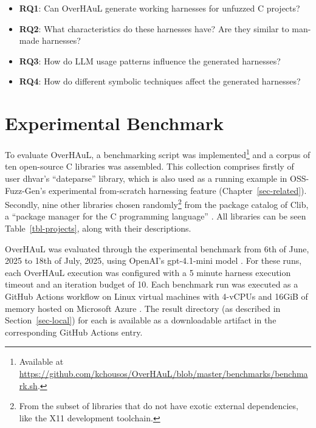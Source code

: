 \documentclass[
  a4paper,
]{scrreprt}
\theoremstyle{definition}
\theoremstyle{remark}
\begin{document}
\begin{itemize}
\item
  \textbf{RQ1}: Can OverHAuL generate working harnesses for unfuzzed C
  projects?
\item
  \textbf{RQ2}: What characteristics do these harnesses have? Are they
  similar to man-made harnesses?
\item
  \textbf{RQ3}: How do LLM usage patterns influence the generated
  harnesses?
\item
  \textbf{RQ4}: How do different symbolic techniques affect the
  generated harnesses?
\end{itemize}

\section{Experimental Benchmark}\label{sec-benchmark}

To evaluate OverHAuL, a benchmarking script was implemented\footnote{Available
  at
  \url{https://github.com/kchousos/OverHAuL/blob/master/benchmarks/benchmark.sh}.}
and a corpus of ten open-source C libraries was assembled. This
collection comprises firstly of user dhvar's ``dateparse'' library,
which is also used as a running example in OSS-Fuzz-Gen's
\autocite{oss-fuzz-gen} experimental from-scratch harnessing feature
(Chapter~\ref{sec-related}). Secondly, nine other libraries chosen
randomly\footnote{From the subset of libraries that do not have exotic
  external dependencies, like the X11 development toolchain.} from the
package catalog of Clib, a ``package manager for the C programming
language'' \autocite{clibs,clib}. All libraries can be seen
Table~\ref{tbl-projects}, along with their descriptions.

OverHAuL was evaluated through the experimental benchmark from 6th of
June, 2025 to 18th of July, 2025, using OpenAI's gpt-4.1-mini model
\autocite{openaidocs2025}. For these runs, each OverHAuL execution was
configured with a 5 minute harness execution timeout and an iteration
budget of 10. Each benchmark run was executed as a GitHub Actions
workflow on Linux virtual machines with 4-vCPUs and 16GiB of memory
hosted on Microsoft Azure \autocite{githubdocs2025a,githubdocs2025}. The
result directory (as described in Section~\ref{sec-local}) for each is
available as a downloadable artifact in the corresponding GitHub Actions
entry.
\end{document}
